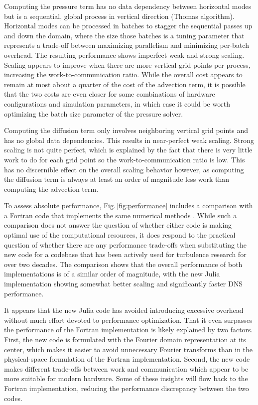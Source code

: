 \documentclass[gmd, manuscript]{copernicus}
\begin{document}
Computing the pressure term has no data dependency between horizontal modes but is a sequential, global process in vertical direction (Thomas algorithm).
Horizontal modes can be processed in batches to stagger the sequential passes up and down the domain, where the size those batches is a tuning parameter that represents a trade-off between maximizing parallelism and minimizing per-batch overhead.
The resulting performance shows imperfect weak and strong scaling.
Scaling appears to improve when there are more vertical grid points per process, increasing the work-to-communication ratio.
While the overall cost appears to remain at most about a quarter of the cost of the advection term, it is possible that the two costs are even closer for some combinations of hardware configurations and simulation parameters, in which case it could be worth optimizing the batch size parameter of the pressure solver.

Computing the diffusion term only involves neighboring vertical grid points and has no global data dependencies.
This results in near-perfect weak scaling.
Strong scaling is not quite perfect, which is explained by the fact that there is very little work to do for each grid point so the work-to-communication ratio is low.
This has no discernible effect on the overall scaling behavior however, as computing the diffusion term is always at least an order of magnitude less work than computing the advection term.

To assess absolute performance, Fig.\,\ref{fig:performance} includes a comparison with a Fortran code that implements the same numerical methods \citep{Giometto+2017a}.
While such a comparison does not answer the question of whether either code is making optimal use of the computational resources, it does respond to the practical question of whether there are any performance trade-offs when substituting the new code for a codebase that has been actively used for turbulence research for over two decades.
The comparison shows that the overall performance of both implementations is of a similar order of magnitude, with the new Julia implementation showing somewhat better scaling and significantly faster DNS performance.

It appears that the new Julia code has avoided introducing excessive overhead without much effort devoted to performance optimization.
That it even surpasses the performance of the Fortran implementation is likely explained by two factors.
First, the new code is formulated with the Fourier domain representation at its center, which makes it easier to avoid unnecessary Fourier transforms than in the physical-space formulation of the Fortran implementation.
Second, the new code makes different trade-offs between work and communication which appear to be more suitable for modern hardware.
Some of these insights will flow back to the Fortran implementation, reducing the performance discrepancy between the two codes.
\end{document}

